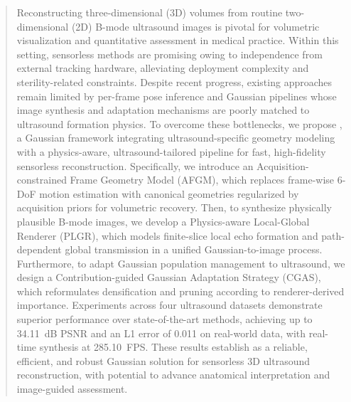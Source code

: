 \begin{abstract}
Reconstructing three-dimensional (3D) volumes from routine two-dimensional (2D)
B-mode ultrasound images is pivotal for volumetric visualization and
quantitative assessment in medical practice.
Within this setting, sensorless methods are promising owing to independence from
external tracking hardware, alleviating deployment complexity and
sterility-related constraints.
Despite recent progress, existing approaches remain limited by per-frame pose
inference and Gaussian pipelines whose image synthesis and adaptation mechanisms
are poorly matched to ultrasound formation physics.
To overcome these bottlenecks, we propose \methodname{}, a Gaussian framework
integrating ultrasound-specific geometry modeling with a physics-aware,
ultrasound-tailored pipeline for fast, high-fidelity sensorless reconstruction.
Specifically, we introduce an Acquisition-constrained Frame Geometry Model
(AFGM), which replaces frame-wise 6-DoF motion estimation with canonical
geometries regularized by acquisition priors for volumetric recovery.
Then, to synthesize physically plausible B-mode images, we develop a
Physics-aware Local-Global Renderer (PLGR), which models finite-slice local echo
formation and path-dependent global transmission in a unified Gaussian-to-image
process.
Furthermore, to adapt Gaussian population management to ultrasound, we design a
Contribution-guided Gaussian Adaptation Strategy (CGAS), which reformulates
densification and pruning according to renderer-derived importance.
Experiments across four ultrasound datasets demonstrate superior performance
over state-of-the-art methods, achieving up to 34.11~dB PSNR and an L1 error of
0.011 on real-world data, with real-time synthesis at 285.10~FPS.
These results establish \methodname{} as a reliable, efficient, and robust
Gaussian solution for sensorless 3D ultrasound reconstruction, with potential
to advance anatomical interpretation and image-guided assessment.
\end{abstract}